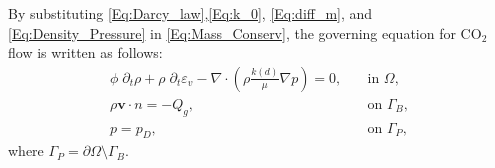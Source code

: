 

By substituting \eqref{Eq:Darcy_law},\eqref{Eq:k_0}, \eqref{Eq:diff_m}, and \eqref{Eq:Density_Pressure} in \eqref{Eq:Mass_Conserv}, the governing equation for CO$_2$ flow is written as follows: 
\begin{equation}\label{Eq:General_pressure}
\begin{aligned}
\phi \; \partial_t \rho+\rho \; \partial_t \varepsilon_v -\nabla \cdot \left( \rho \frac{ k(d)}{\mu} \nabla p \right) =0,  \quad  &\text{in~} \Omega,\\
\rho{\bm{v}} \cdot n =-Q_g, \quad &\text{on~} \Gamma_B,\\
p = p_D, \quad &\text{on~}\Gamma_P,
\end{aligned}
\end{equation}
where $\Gamma_P=\partial\Omega\setminus\Gamma_B$. 

